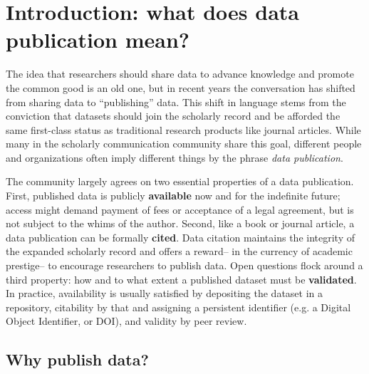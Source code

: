 \documentclass[10pt,a4paper,twocolumn]{article}
\begin{document}
\section*{Introduction: what does data publication mean?}\label{introduction}

The idea that researchers should share data to advance knowledge and promote the common good is an old one, but in recent years the conversation has shifted from sharing data to ``publishing'' data.\cite{costello_motivating_2009,smith_data_2009,lawrence_data_2011}
This shift in language stems from the conviction that datasets should join the scholarly record and be afforded the same first-class status as traditional research products like journal articles.\cite{reilly_report_2011, sarah_callaghan_making_2012}
While many in the scholarly communication community share this goal, different people and organizations often imply different things by the phrase \emph{data publication}.

The community largely agrees on two essential properties of a data publication\cite{smith_data_2009,sarah_callaghan_making_2012}.
First, published data is publicly \textbf{available} now and for the indefinite future; access might demand payment of fees or acceptance of a legal agreement, but is not subject to the whims of the author.
Second, like a book or journal article, a data publication can be formally \textbf{cited}.
Data citation maintains the integrity of the expanded scholarly record and offers a reward-- in the currency of academic prestige-- to encourage researchers to publish data. 
Open questions flock around a third property: how and to what extent a published dataset must be \textbf{validated}.
In practice, availability is usually satisfied by depositing the dataset in a repository, citability by that and assigning a persistent identifier (e.g. a Digital Object Identifier, or DOI), and validity by peer review.

\subsection*{Why publish data?}\label{why-publish-data}
\end{document}
